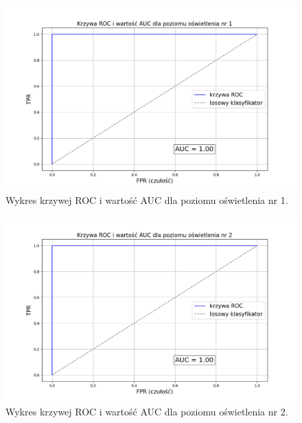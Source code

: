 \begin{figure}[H]
    \centering
    \includegraphics[width=\linewidth]{r_test_dokładności/AUC_charts/1.png}
    \caption{Wykres krzywej ROC i wartość AUC dla poziomu oświetlenia nr 1.}
    \label{fig:ROC-1}
\end{figure}

\begin{figure}[H]
    \centering
    \includegraphics[width=\linewidth]{r_test_dokładności/AUC_charts/2.png}
    \caption{Wykres krzywej ROC i wartość AUC dla poziomu oświetlenia nr 2.}
    \label{fig:ROC-2}
\end{figure}

